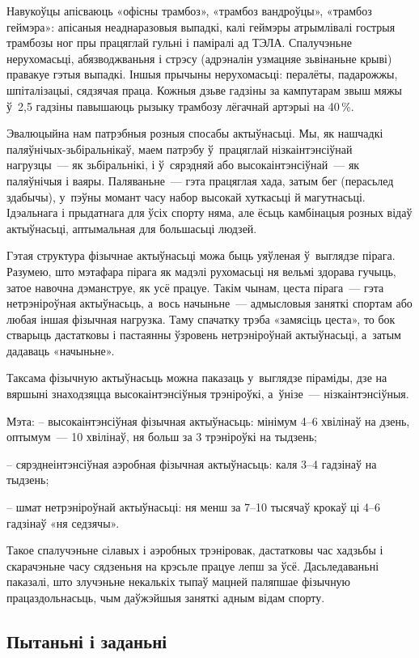 Навукоўцы апісваюць «офісны трамбоз», «трамбоз вандроўцы», «трамбоз геймэра»: апісаныя неаднаразовыя выпадкі, калі геймэры атрымлівалі гострыя трамбозы ног пры працяглай гульні і паміралі ад ТЭЛА. Спалучэньне нерухомасьці, абязводжваньня і стрэсу (адрэналін узмацняе зьвінаньне крыві) правакуе гэтыя выпадкі. Іншыя прычыны нерухомасьці: пералёты, падарожжы, шпіталізацыі, сядзячая праца. Кожныя дзьве гадзіны за кампутарам звыш мяжы ў~2,5 гадзіны павышаюць рызыку трамбозу лёгачнай артэрыі на 40\,\%.

Эвалюцыйна нам патрэбныя розныя спосабы актыўнасьці. Мы, як нашчадкі паляўнічых-зьбіральнікаў, маем патрэбу ў~працяглай нізкаінтэнсіўнай нагрузцы~--- як зьбіральнікі, і ў~сярэдняй або высокаінтэнсіўнай~--- як паляўнічыя і ваяры. Паляваньне~--- гэта працяглая хада, затым бег (перасьлед здабычы), у~пэўны момант часу набор высокай хуткасьці й магутнасьці. Ідэальнага і прыдатнага для ўсіх спорту няма, але ёсьць камбінацыя розных відаў актыўнасьці, аптымальная для большасьці людзей.

Гэтая структура фізычнае актыўнасьці можа быць уяўленая ў~выглядзе пірага. Разумею, што мэтафара пірага як мадэлі рухомасьці ня вельмі здорава гучыць, затое навочна дэманструе, як усё працуе. Такім чынам, цеста пірага~--- гэта нетрэніроўная актыўнасьць, а~вось начыньне~--- адмысловыя заняткі спортам або любая іншая фізычная нагрузка. Таму спачатку трэба «замясіць цеста», то бок стварыць дастатковы і пастаянны ўзровень нетрэніроўнай актыўнасьці, а~затым дадаваць «начыньне».

Таксама фізычную актыўнасьць можна паказаць у~выглядзе піраміды, дзе на вяршыні знаходзяцца высокаінтэнсіўныя трэніроўкі, а~ўнізе~--- нізкаінтэнсіўныя.

Мэта:
– высокаінтэнсіўная фізычная актыўнасьць: мінімум 4--6 хвілінаў на дзень, оптымум~--- 10 хвілінаў, ня больш за 3 трэніроўкі на тыдзень; 

– сярэднеінтэнсіўная аэробная фізычная актыўнасьць: каля 3--4 гадзінаў на тыдзень;

– шмат нетрэніроўнай актыўнасьці: ня менш за 7--10 тысячаў крокаў ці 4--6 гадзінаў «ня седзячы».

Такое спалучэньне сілавых і аэробных трэніровак, дастатковы час хадзьбы і скарачэньне часу сядзеньня на крэсьле працуе лепш за ўсё. Дасьледаваньні паказалі, што злучэньне некалькіх тыпаў мацней паляпшае фізычную працаздольнасьць, чым даўжэйшыя заняткі адным відам спорту.

\subsection*{Пытаньні і заданьні}

